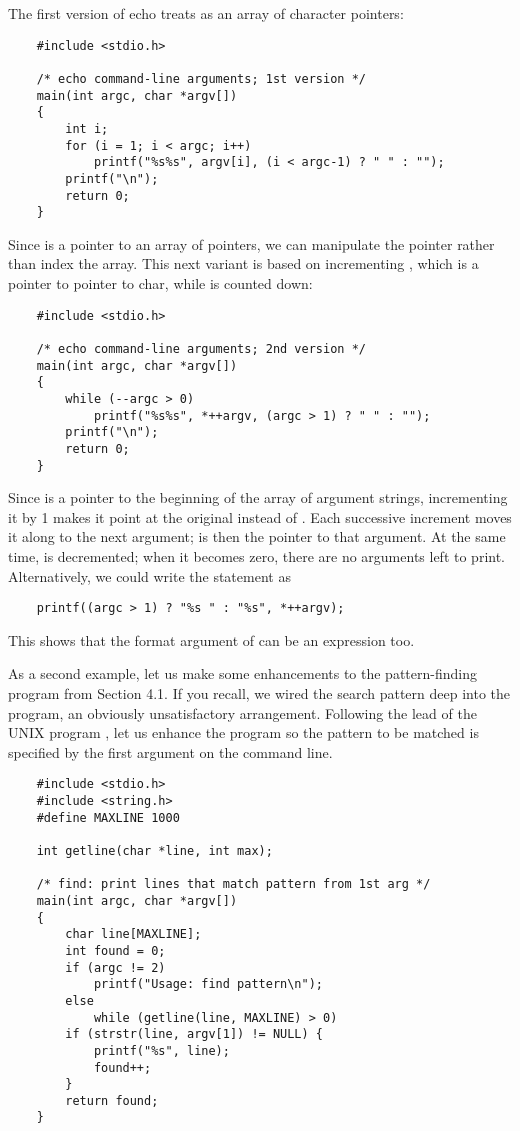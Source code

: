 The first version of echo treats  as an array of character pointers:
\begin{lstlisting}
    #include <stdio.h>

    /* echo command-line arguments; 1st version */
    main(int argc, char *argv[])
    {
        int i;
        for (i = 1; i < argc; i++)
            printf("%s%s", argv[i], (i < argc-1) ? " " : "");
        printf("\n");
        return 0;
    }
\end{lstlisting}
Since  is a pointer to an array of pointers, we can manipulate the pointer rather than index the array.
This next variant is based on incrementing , which is a pointer to pointer to char, while  is counted down:

\begin{lstlisting}
    #include <stdio.h>

    /* echo command-line arguments; 2nd version */
    main(int argc, char *argv[])
    {
        while (--argc > 0)
            printf("%s%s", *++argv, (argc > 1) ? " " : "");
        printf("\n");
        return 0;
    }
\end{lstlisting}

Since  is a pointer to the beginning of the array of argument strings, incrementing it by 1  makes it point at the original  instead of .
Each successive increment moves it along to the next argument;  is then the pointer to that argument.
At the same time,  is decremented; when it becomes zero, there are no arguments left to print.
Alternatively, we could write the  statement as
\begin{lstlisting}
    printf((argc > 1) ? "%s " : "%s", *++argv);
\end{lstlisting}
This shows that the format argument of  can be an expression too.

As a second example, let us make some enhancements to the pattern-finding program from Section 4.1.
If you recall, we wired the search pattern deep into the program, an obviously unsatisfactory arrangement.
Following the lead of the UNIX program , let us enhance the program so the pattern to be matched is specified by the first argument on the command line.

\begin{lstlisting}
    #include <stdio.h>
    #include <string.h>
    #define MAXLINE 1000

    int getline(char *line, int max);

    /* find: print lines that match pattern from 1st arg */
    main(int argc, char *argv[])
    {
        char line[MAXLINE];
        int found = 0;
        if (argc != 2)
            printf("Usage: find pattern\n");
        else
            while (getline(line, MAXLINE) > 0)
        if (strstr(line, argv[1]) != NULL) {
            printf("%s", line);
            found++;
        }
        return found;
    }
\end{lstlisting}

